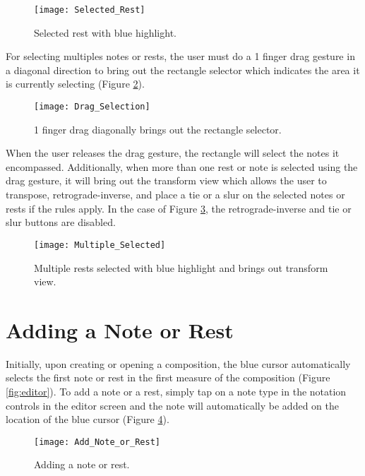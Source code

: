 \begin{figure}[H]
  \centering
  \texttt{[image: Selected\_Rest]}
    \caption{Selected rest with blue highlight.}
    \label{fig:selected-rest}
\end{figure}

For selecting multiples notes or rests, the user must do a 1 finger drag gesture in a diagonal direction to bring out the rectangle selector which indicates the area it is currently selecting (Figure \ref{fig:drag-selection}).

\begin{figure}[H]
  \centering
  \texttt{[image: Drag\_Selection]}
    \caption{1 finger drag diagonally brings out the rectangle selector.}
    \label{fig:drag-selection}
\end{figure}

When the user releases the drag gesture, the rectangle will select the notes it encompassed. Additionally, when more than one rest or note is selected using the drag gesture, it will bring out the transform view which allows the user to transpose, retrograde-inverse, and place a tie or a slur on the selected notes or rests if the rules apply. In the case of Figure \ref{fig:multiple-selected}, the retrograde-inverse and tie or slur buttons are disabled.

\begin{figure}[H]
  \centering
  \texttt{[image: Multiple\_Selected]}
    \caption{Multiple rests selected with blue highlight and brings out transform view.}
    \label{fig:multiple-selected}
\end{figure}

\section{Adding a Note or Rest}
Initially, upon creating or opening a composition, the blue cursor automatically selects the first note or rest in the first measure of the composition (Figure \ref{fig:editor}). To add a note or a rest, simply tap on a note type in the notation controls in the editor screen and the note will automatically be added on the location of the blue cursor (Figure \ref{fig:add-note-rest}).

\begin{figure}[H]
  \centering
  \texttt{[image: Add\_Note\_or\_Rest]}
    \caption{Adding a note or rest.}
    \label{fig:add-note-rest}
\end{figure}


